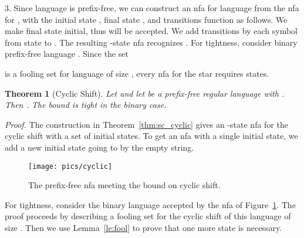 \documentclass[copyright]{eptcs}
\newtheorem{theorem}{Theorem}
\begin{document}
  3. Since  language  is prefix-free,
  we can construct an nfa for  language 
  from the nfa for , with the initial state , final state ,
  and transitions function  as follows.
  We make  final  state  initial, thus  will be accepted.
  We add transitions by each symbol 
  from state   to .
  The resulting -state nfa recognizes .
  For tightness, consider  binary prefix-free language .
  Since the set 
   
  is a fooling set for  language  of size ,
  every nfa for the star  requires  states.
 \hfill

 \begin{theorem}[Cyclic Shift]\label{thm:cyclic}
  Let  and let  be a prefix-free regular language  with .
  Then .
  The bound is tight in the binary case.
 \end{theorem}

 \noindent\emph{Proof.}
  The construction in  Theorem~\ref{thm:sc_cyclic}
  gives an -state nfa for the cyclic shift
  with a set 
  of initial states.
  To get an nfa with a single initial state,
  we add a new initial state going to  by the empty string.
  \begin{figure}[b]
  \centerline{\texttt{[image: pics/cyclic]}}
  \caption{The prefix-free nfa meeting the bound  on cyclic shift.}
  \label{fig:cyclic}
  \end{figure}
  For tightness, consider the binary language
  accepted by the nfa of Figure~\ref{fig:cyclic}.
  The proof proceeds by  describing a fooling set 
  for the cyclic shift of this language
  of size . Then we use Lemma~\ref{le:fool}
  to prove that one more state is necessary. 
 \hfill



\end{document}

